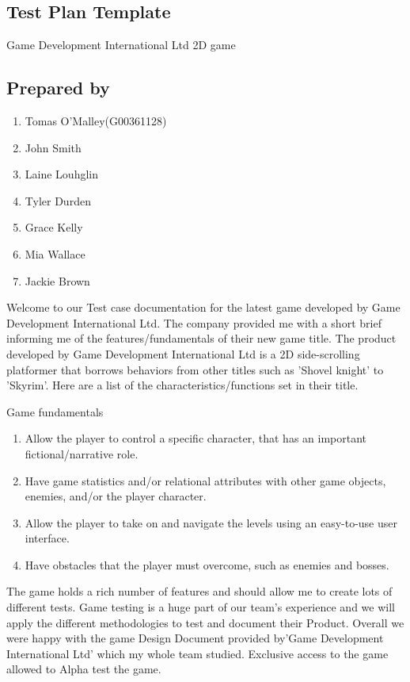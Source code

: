 
\subsection{Test Plan Template}
Game Development International Ltd 2D game 
\subsection{Prepared by }


\begin{enumerate}
  	\item Tomas O'Malley(G00361128)
  	\item John Smith 
	\item Laine Louhglin 
	\item Tyler Durden 
	\item Grace Kelly 
	\item Mia Wallace
	\item Jackie Brown


\end{enumerate}


Welcome to our Test case documentation for the latest game developed by Game Development International Ltd.
The company provided me with a short brief informing me of the features/fundamentals of their new game title.
The product developed by  Game Development International Ltd is a 2D side-scrolling platformer that borrows
behaviors from other titles such as 'Shovel knight' to 'Skyrim'. Here are a list of the characteristics/functions
set in their title.


\centerline{Game fundamentals}

\begin{enumerate}
  \item Allow the player to control a specific character, that has an important
fictional/narrative role.
  \item Have game statistics and/or relational attributes with other game objects, enemies,
and/or the player character.

\item Allow the player to take on and navigate the levels using an easy-to-use user
interface.

\item Have obstacles that the player must overcome, such as enemies and bosses.
\end{enumerate}

The game holds a rich number of features and should allow me to create lots of different tests. Game testing is a huge part of our team's experience and we will apply the different methodologies to test and document their Product. Overall we were happy with the game Design Document provided by'Game Development International Ltd' which my whole team studied. Exclusive access to the game allowed to Alpha test the game.